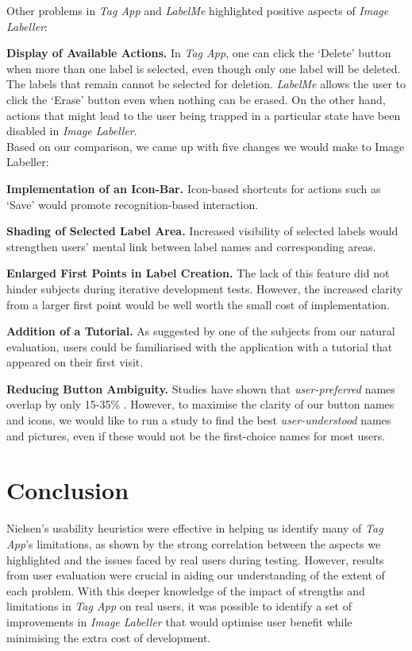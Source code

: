 \documentclass[11pt,twocolumn]{article}
\begin{document}
\noindent Other problems in \emph{Tag App} and \emph{LabelMe} highlighted positive aspects of
\emph{Image Labeller}:

\textbf{Display of Available Actions.} In \emph{Tag App}, one can click the
`Delete' button when more than one label is selected, even though only one
label will be deleted. The labels that remain cannot be selected for deletion.
\emph{LabelMe} allows the user to click the `Erase' button even when nothing can be
erased. On the other hand, actions that might lead to the user being trapped in
a particular state have been disabled in \emph{Image Labeller}. \\

Based on our comparison, we came up with five changes we would make to Image
Labeller:

\textbf{Implementation of an Icon-Bar.} Icon-based shortcuts for actions such as `Save' would promote recognition-based interaction.

 \textbf{Shading of Selected Label Area.} Increased visibility of selected labels would strengthen users' mental link between label names and corresponding areas.

\textbf{Enlarged First Points in Label Creation.} The lack of this feature did not hinder subjects during iterative development tests. However, the increased clarity from a larger first point would be well worth the small cost of implementation.

\textbf{Addition of a Tutorial.} As suggested by one of the subjects from our natural evaluation, users could be familiarised with the application with a tutorial that appeared on their first visit.

\textbf{Reducing Button Ambiguity.} Studies have shown that \emph{user-preferred} names overlap by only 15-35\% \cite{furnas1987}. However, to maximise the clarity of our button names and icons, we would like to run a study to find the best \emph{user-understood} names and pictures, even if these would not be the first-choice names for most users.  

\section{Conclusion}

Nielsen's usability heuristics were effective in helping us identify many of \emph{Tag App}'s limitations, as shown by the strong correlation between the aspects we highlighted and the issues faced by real users during testing. However, results from user evaluation were crucial in aiding our understanding of the extent of each problem. With this deeper knowledge of the impact of strengths and limitations in \emph{Tag App} on real users, it was possible to identify a set of improvements in \emph{Image Labeller} that would optimise user benefit while minimising the extra cost of development.
\end{document}
